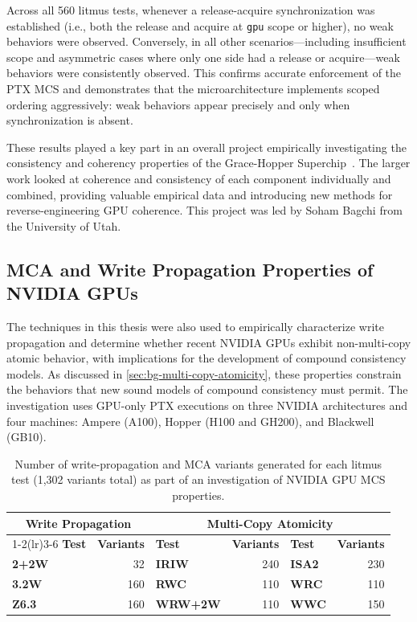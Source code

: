Across all 560 litmus tests, whenever a release-acquire synchronization was established (i.e., both the release and acquire at \texttt{gpu} scope or higher), no weak behaviors were observed. Conversely, in all other scenarios---including insufficient scope and asymmetric cases where only one side had a release or acquire---weak behaviors were consistently observed. This confirms accurate enforcement of the PTX MCS and demonstrates that the microarchitecture implements scoped ordering aggressively: weak behaviors appear precisely and only when synchronization is absent.

These results played a key part in an overall project empirically investigating the consistency and coherency properties of the Grace-Hopper Superchip~\cite{bagchi2026gh}. The larger work looked at coherence and consistency of each component individually and combined, providing valuable empirical data and introducing new methods for reverse-engineering GPU coherence. This project was led by Soham Bagchi from the University of Utah.

\subsection{MCA and Write Propagation Properties of NVIDIA GPUs \label{sec:gpuharbor-nvidia-beyond-fence}}

The techniques in this thesis were also used to empirically characterize write propagation and determine whether recent NVIDIA GPUs exhibit non-multi-copy atomic behavior, with implications for the development of compound consistency models. As discussed in \mysec\ref{sec:bg-multi-copy-atomicity}, these properties constrain the behaviors that new sound models of compound consistency must permit. The investigation uses GPU-only PTX executions on three NVIDIA architectures and four machines: Ampere (A100), Hopper (H100 and GH200), and Blackwell (GB10).

\begin{table}[t]
\footnotesize
\centering
\caption{Number of write-propagation and MCA variants generated for each litmus test (1,302 variants total) as part of an investigation of NVIDIA GPU MCS properties.}
\begingroup
{}
\begin{tabular}{l r l r l r}
\toprule
\multicolumn{2}{c}{\textbf{Write Propagation}} &
\multicolumn{4}{c}{\textbf{Multi-Copy Atomicity}} \\
\cmidrule(lr){1-2}\cmidrule(lr){3-6}
\textbf{Test} & \textbf{Variants} & \textbf{Test} & \textbf{Variants} & \textbf{Test} & \textbf{Variants} \\
\midrule
\textbf{2+2W} & 32 & \textbf{IRIW} & 240 & \textbf{ISA2} & 230 \\
\textbf{3.2W} & 160 & \textbf{RWC} & 110 & \textbf{WRC} & 110 \\
\textbf{Z6.3} & 160 & \textbf{WRW+2W} & 110 & \textbf{WWC} & 150 \\
\bottomrule
\end{tabular}
\endgroup
\label{tab:gpuharbor-nvidia-propagation-tests}
\end{table}

